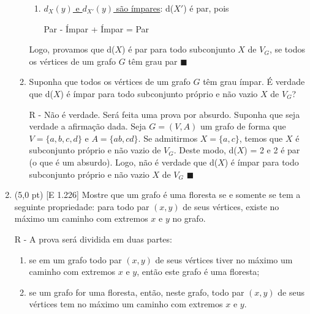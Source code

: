 \documentclass[12pt,a4paper,oneside]{article}
\begin{document}
\begin{enumerate}
\begin{enumerate}
{\begin{itemize}
\begin{itemize}
\begin{enumerate}
\begin{center}
							{\sc Par} - {\sc Par} + {\sc Par} = {\sc Par}
						\end{center} 
						\item \underline{$d_{X}(y)$ e $d_{X'}(y)$ são ímpares}: d($X'$) é par, pois 
						\begin{center}
							{\sc Par} - {\sc Ímpar} + {\sc Ímpar} = {\sc Par}
						\end{center} 
					\end{enumerate}
				\end{itemize}
		\end{itemize}
		Logo, provamos que d($X$) é par para todo subconjunto $X$ de $V_G$, se todos os vértices de um grafo $G$ têm grau par $\blacksquare$
		}
		
		\newpage
		
			\item Suponha que todos os vértices de um grafo $G$ têm grau ímpar. É verdade que d($X$) é ímpar para todo subconjunto próprio e não vazio $X$ de $V_G$?
					
	\vspace{0.3cm}
	
	{\color{verde}
		R - Não é verdade. Será feita uma prova por absurdo. Suponha que seja verdade a afirmação dada. Seja $G = (V,A)$ um grafo de forma que $V=\{a,b,c,d\}$ e $A=\{ab, cd\}$. Se admitirmos $X = \{ a, c \}$, temos que $X$ é subconjunto próprio e não vazio de $V_G$. Deste modo, d($X$) = 2 e 2 é par (o que é um absurdo). Logo, não é verdade que d($X$) é ímpar para todo subconjunto próprio e não vazio $X$ de $V_G$ $\blacksquare$
	} 
		\end{enumerate}
		
	\newpage
	
	\item (5,0 pt) [E 1.226] Mostre que um grafo é uma floresta se e somente se tem a seguinte propriedade: para todo par $(x, y)$ de seus vértices, existe no máximo um caminho com extremos $x$ e $y$ no grafo.
	
	\vspace{0.3cm}
	
	{\color{verde}
		R - A prova será dividida em duas partes: 
		\begin{enumerate}
			\item se em um grafo todo par $(x, y)$ de seus vértices tiver no máximo um caminho com extremos $x$ e $y$, então este grafo é uma floresta;
			\item se um grafo for uma floresta, então, neste grafo, todo par $(x, y)$ de seus vértices tem no máximo um caminho com extremos $x$ e $y$.
		\end{enumerate}
		
}
\end{enumerate}
\end{document}

